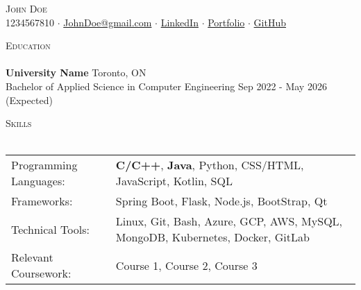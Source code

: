 \documentclass[a4paper]{article}
\newcommand{\lineunder} {
    \vspace*{-8pt} \\
    \hspace*{-18pt} \hrulefill \hspace*{-0.5cm} \\
}
\newcommand{\header} [1] {
    {\hspace*{-18pt}\vspace*{6pt} \textsc{#1}}
    \vspace*{-6pt} \lineunder
}
\begin{document}
\vspace*{-40pt}

    

\vspace*{-10pt}
\begin{center}
	{\Huge \scshape {John Doe}}\\
	1234567810 $\cdot$ \href{mailto:JohnDoe@gmail.com}{JohnDoe@gmail.com} $\cdot$ \href{https://www.google.com}{LinkedIn} $\cdot$ \href{https://www.google.com}{Portfolio} $\cdot$ \href{https://www.google.com}{GitHub}\\
\end{center}

\header{Education}
\textbf{University Name} \hfill Toronto, ON \\
Bachelor of Applied Science in Computer Engineering \hfill Sep 2022 - May 2026 (Expected)\\
\vspace{2mm}

\header{Skills}
\noindent
\begin{tabular}{@{} p{4cm} p{14cm} @{}}
    Programming Languages: & \textbf{C/C++}, \textbf{Java}, Python, CSS/HTML, JavaScript, Kotlin, SQL            \\
    Frameworks: & Spring Boot, Flask, Node.js, BootStrap, Qt\\
    Technical Tools: & Linux, Git, Bash, Azure, GCP, AWS, MySQL, MongoDB, Kubernetes, Docker, GitLab       \\
 Relevant Coursework: &Course 1, Course 2, Course 3\\
\end{tabular}
\vspace{2mm}
\end{document}
